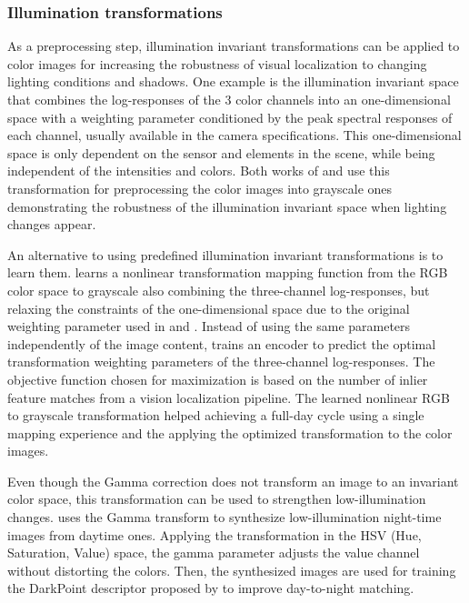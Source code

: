 \subsubsection{Illumination transformations}
\label{sec:discussion:appearance:illumination}

As a preprocessing step, illumination invariant transformations can be applied to color images for increasing the robustness of visual localization to changing lighting conditions and shadows.
One example is the illumination invariant space that combines the log-responses of the 3 color channels into an one-dimensional space with a weighting parameter conditioned by the peak spectral responses of each channel, usually available in the camera specifications. This one-dimensional space is only dependent on the sensor and elements in the scene, while being independent of the intensities and colors.
Both works of \cite{arroyo-et-al:2018:7} and \cite{yang-et-al:2021:12054} use this transformation for preprocessing the color images into grayscale ones demonstrating the robustness of the illumination invariant space when lighting changes appear.

An alternative to using predefined illumination invariant transformations is to learn them.
\cite{clement-et-al:2020:2967659} learns a nonlinear transformation mapping function from the RGB color space to grayscale also combining the three-channel log-responses, but relaxing the constraints of the one-dimensional space due to the original weighting parameter used in \cite{arroyo-et-al:2018:7} and \cite{yang-et-al:2021:12054}. Instead of using the same parameters independently of the image content, \cite{clement-et-al:2020:2967659} trains an encoder to predict the optimal transformation weighting parameters of the three-channel log-responses.
The objective function chosen for maximization is based on the number of inlier feature matches from a vision localization pipeline.
The learned nonlinear RGB to grayscale transformation helped achieving a full-day cycle using a single mapping experience and the applying the optimized transformation to the color images.

Even though the Gamma correction does not transform an image to an invariant color space, this transformation can be used to strengthen low-illumination changes. \cite{sun-et-al:2021:9635886} uses the Gamma transform to synthesize low-illumination night-time images from daytime ones. Applying the transformation in the HSV (Hue, Saturation, Value) space, the gamma parameter adjusts the value channel without distorting the colors. Then, the synthesized images are used for training the DarkPoint descriptor proposed by \cite{sun-et-al:2021:9635886} to improve day-to-night matching.



